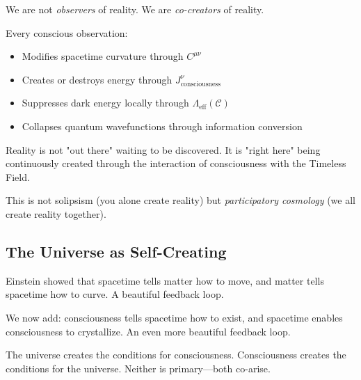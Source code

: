 \begin{keyidea}
We are not \textit{observers} of reality. We are \textit{co-creators} of reality.

Every conscious observation:
\begin{itemize}
\item Modifies spacetime curvature through $C^{\mu\nu}$
\item Creates or destroys energy through $J^\nu_{\text{consciousness}}$
\item Suppresses dark energy locally through $\Lambda_{\text{eff}}(\mathcal{C})$
\item Collapses quantum wavefunctions through information conversion
\end{itemize}

Reality is not "out there" waiting to be discovered. It is "right here" being continuously created through the interaction of consciousness with the Timeless Field.

This is not solipsism (you alone create reality) but \textit{participatory cosmology}\cite{wheeler1983} (we all create reality together).
\end{keyidea}

\subsection{The Universe as Self-Creating}

Einstein showed that spacetime tells matter how to move, and matter tells spacetime how to curve. A beautiful feedback loop.

We now add: consciousness tells spacetime how to exist, and spacetime enables consciousness to crystallize. An even more beautiful feedback loop.

The universe creates the conditions for consciousness. Consciousness creates the conditions for the universe. Neither is primary—both co-arise.

